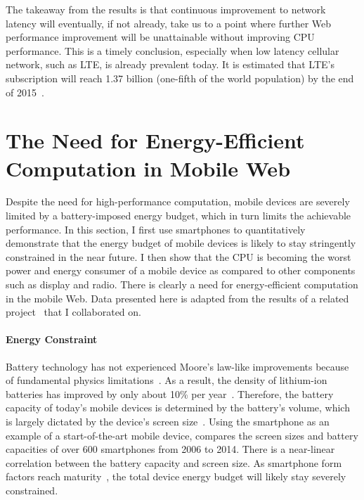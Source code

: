 The takeaway from the results is that continuous improvement to network latency will eventually, if not already, take us to a point where further Web performance improvement will be unattainable without improving CPU performance.  This is a timely conclusion, especially when low latency cellular network, such as LTE, is already prevalent today. It is estimated that LTE's subscription will reach 1.37 billion (one-fifth of the world population) by the end of 2015~\cite{lte_subscription}.

\section{The Need for Energy-Efficient Computation in Mobile Web}
\label{sec:motivation:energy}

Despite the need for high-performance computation, mobile devices are severely limited by a battery-imposed energy budget, which in turn limits the achievable performance. In this section, I first use smartphones to quantitatively demonstrate that the energy budget of mobile devices is likely to stay stringently constrained in the near future. I then show that the CPU is becoming the worst power and energy consumer of a mobile device as compared to other components such as display and radio. There is clearly a need for energy-efficient computation in the mobile Web. Data presented here is adapted from the results of a related project~\cite{mobilecpu} that I collaborated on.

\paragraph{Energy Constraint} Battery technology has not experienced Moore's law-like improvements because of fundamental physics limitations~\cite{battery-mooreslaw}. As a result, the density of lithium-ion batteries has improved by only about 10\% per year~\cite{battery-stats}.  Therefore, the battery capacity of today's mobile devices is determined by the battery's volume, which is largely dictated by the device's screen size~\cite{phonescreen}. Using the smartphone as an example of a start-of-the-art mobile device,  compares the screen sizes and battery capacities of over 600 smartphones from 2006 to 2014. There is a near-linear correlation between the battery capacity and screen size. As smartphone form factors reach maturity~\cite{phonesize}, the total device energy budget will likely stay severely constrained.

